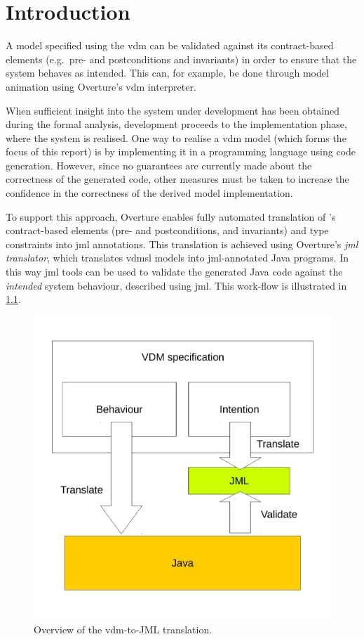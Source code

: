 
\chapter{Introduction}

A model specified using the \ac{vdm} can be validated against its
contract-based elements (e.g.\ pre- and postconditions and invariants)
in order to ensure that the system behaves as intended. This can, for
example, be done through model animation using Overture's \ac{vdm}
interpreter.

When sufficient insight into the system under development has been
obtained during the formal analysis, development proceeds to the
implementation phase, where the system is realised. One way to realise
a \ac{vdm} model (which forms the focus of this report) is by
implementing it in a programming language using code
generation. However, since no guarantees are currently made about the
correctness of the generated code, other measures must be taken to
increase the confidence in the correctness of the derived model
implementation.

To support this approach, Overture enables fully automated translation
of \vsl's contract-based elements (pre- and postconditions, and
invariants) and type constraints into \ac{jml} annotations. This
translation is achieved using Overture's \emph{\ac{jml} translator},
which translates \ac{vdmsl} models into \ac{jml}-annotated Java
programs. In this way \ac{jml} tools can be used to validate the
generated Java code against the \emph{intended} system behaviour,
described using \ac{jml}. This work-flow is illustrated in
\cref{fig:vdm2jml-overview}.

\begin{figure}[!ht]
  \centering
  \includegraphics[width=0.6\linewidth]{figs/vdm2jml}
  \caption {Overview of the \ac{vdm}-to-JML translation.}
  \label{fig:vdm2jml-overview}
\end{figure}

